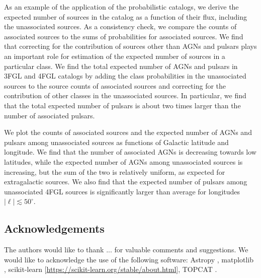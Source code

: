 As an example of the application of the probabilistic catalogs, we derive the expected number of sources in the catalog as a function of their flux, including the unassociated sources.
As a consistency check, we compare the counts of associated sources to the sums of probabilities for associated sources.
We find that correcting for the contribution of sources other than AGNs and pulsars plays an important role for estimation of the expected number of sources in a particular class.
We find the total expected number of AGNs and pulsars in 3FGL and 4FGL catalogs by adding the class probabilities in the unassociated sources to the source counts of associated sources and correcting for the contribution of other classes in the unassociated sources.
In particular, we find that the total expected number of pulsars is about two times larger than the number of associated pulsars.

We plot the counts of associated sources and the expected number of AGNs and pulsars among unassociated sources
as functions of Galactic latitude and longitude.
We find that the number of associated AGNs is decreasing towards low latitudes, while the expected number of AGNs among unassociated sources is increasing, but the sum of the two is relatively uniform, as expected for extragalactic sources.
We also find that the expected number of pulsars among unassociated 4FGL sources is significantly larger than average for longitudes 
$|\ell | \lesssim 50^\circ$.




\subsection*{Acknowledgements}

The authors would like to thank ...
for valuable comments and suggestions.
We would like to acknowledge the use of the following software:
Astropy \citep[\url{http://www.astropy.org},][]{2013A&A...558A..33A}, 
matplotlib \citep{Hunter:2007}, 
scikit-learn [\url{https://scikit-learn.org/stable/about.html}], 
TOPCAT \citep{2005ASPC..347...29T}.
